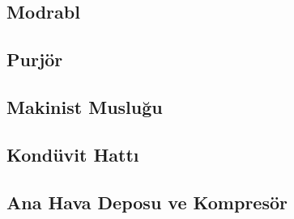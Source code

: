 \documentclass[10pt,a4paper]{article}
\begin{document}
\subsection{Modrabl}

\subsection{Purjör}

\subsection{Makinist Musluğu}

\subsection{Kondüvit Hattı}

\subsection{Ana Hava Deposu ve Kompresör}
\newpage
\end{document}
